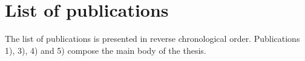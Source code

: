 \documentclass[11pt, b5paper,twoside]{tesi_upf}
\begin{document}
       

 



\cleardoublepage



\cleardoublepage

\clearpage
\tableofcontents

\printindex


\clearpage
\listoffigures


\clearpage
\listoftables




\clearpage
\section*{List of publications}

\par The list of publications is presented in reverse chronological order. Publications 1), 3), 4) and 5) compose the main body of the thesis. 
\end{document}
